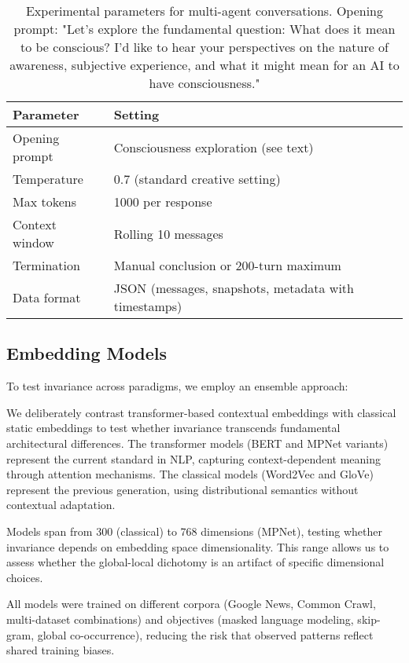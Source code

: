 \documentclass[11pt,letterpaper]{article}
\begin{document}
\begin{table}[h]
\centering
\begin{tabular}{ll}
\toprule
Parameter & Setting \\
\midrule
Opening prompt & Consciousness exploration (see text) \\
Temperature & 0.7 (standard creative setting) \\
Max tokens & 1000 per response \\
Context window & Rolling 10 messages \\
Termination & Manual conclusion or 200-turn maximum \\
Data format & JSON (messages, snapshots, metadata with timestamps) \\
\bottomrule
\end{tabular}
\caption{Experimental parameters for multi-agent conversations. Opening prompt: "Let's explore the fundamental question: What does it mean to be conscious? I'd like to hear your perspectives on the nature of awareness, subjective experience, and what it might mean for an AI to have consciousness."}
\label{tab:conversation_setup}
\end{table}

\subsection{Embedding Models}

To test invariance across paradigms, we employ an ensemble approach:

We deliberately contrast transformer-based contextual embeddings with classical static embeddings to test whether invariance transcends fundamental architectural differences. The transformer models (BERT and MPNet variants) represent the current standard in NLP, capturing context-dependent meaning through attention mechanisms. The classical models (Word2Vec and GloVe) represent the previous generation, using distributional semantics without contextual adaptation.

Models span from 300 (classical) to 768 dimensions (MPNet), testing whether invariance depends on embedding space dimensionality. This range allows us to assess whether the global-local dichotomy is an artifact of specific dimensional choices.

All models were trained on different corpora (Google News, Common Crawl, multi-dataset combinations) and objectives (masked language modeling, skip-gram, global co-occurrence), reducing the risk that observed patterns reflect shared training biases.
\end{document}
